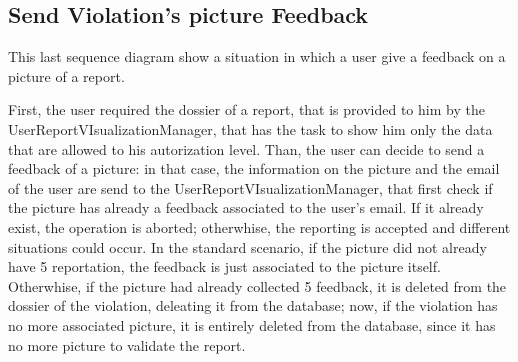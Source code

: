 \documentclass[../RASD.tex]{subfiles}
\begin{document}
    \subsection{Send Violation's picture Feedback}\label{subsec:send-violation's-picture-feedback}
    \begin{figure}[H]
    \end{figure}
    This last sequence diagram show a situation in which a user give a feedback on a picture of a report.

    First, the user required the dossier of a report, that is provided to him by the UserReportVIsualizationManager, that has the task to show him only the data that are allowed to his autorization level. Than, the user can decide to send a feedback of a picture: in that case, the information on the picture and the email of the user are send to the UserReportVIsualizationManager, that first check if the picture has already a feedback associated to the user’s email. If it already exist, the operation is aborted; otherwhise, the reporting is accepted and different situations could occur. In the standard scenario, if the picture did not already have 5 reportation, the feedback is just associated to the picture itself. Otherwhise, if the picture had already collected 5 feedback, it is deleted from the dossier of the violation, deleating it from the database; now, if the violation has no more associated picture, it is entirely deleted from the database, since it has no more picture to validate the report.
    \newpage
\end{document}
